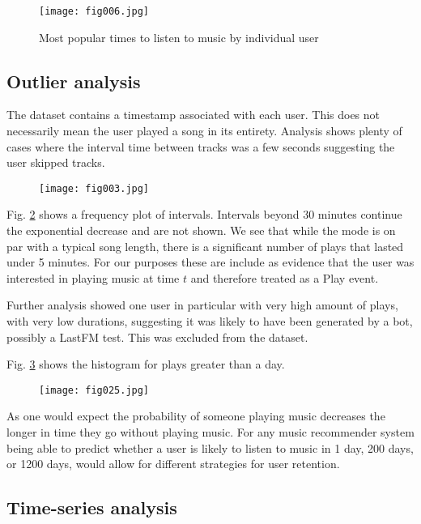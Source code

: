 \begin{figure}[h!]
	\centering
	\texttt{[image: fig006.jpg]}
	\caption{Most popular times to listen to music by individual user}
	\label{3c}
\end{figure} 

\subsection{Outlier analysis}

The dataset contains a timestamp associated with each user. This does not necessarily mean the user played a song in its entirety. Analysis shows plenty of cases where the interval time between tracks was a few seconds suggesting the user skipped tracks. 

\begin{figure}[h!]
	\centering
	\texttt{[image: fig003.jpg]}
	\caption{}
	\label{3d}
\end{figure} 

Fig. \ref{3d} shows a frequency plot of intervals. Intervals beyond 30 minutes continue the exponential decrease and are not shown. We see that while the mode is on par with a typical song length, there is a significant number of plays that lasted under 5 minutes. For our purposes these are include as evidence that the user was interested in playing music at time $t$ and therefore treated as a Play event.

Further analysis showed one user in particular with very high amount of plays, with very low durations, suggesting it was likely to have been generated by a bot, possibly a LastFM test. This was excluded from the dataset.

Fig. \ref{fig25} shows the histogram for plays greater than a day. 
\begin{figure}[h!]
	\centering
	\texttt{[image: fig025.jpg]}
	\caption{}
	\label{fig25}
\end{figure} 

As one would expect the probability of someone playing music decreases the longer in time they go without playing music. For any music recommender system being able to predict whether a user is likely to listen to music in 1 day, 200 days, or 1200 days, would allow for different strategies for user retention.

\subsection{Time-series analysis}


